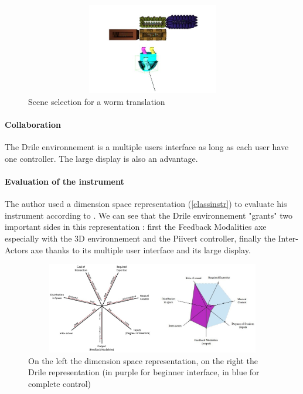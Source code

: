 \begin{figure}[h!]
\centering\includegraphics[width=14cm,height=4cm]{image/scenes.JPG}
\caption{Scene selection for a worm translation}
\label{fig:scene}
\end{figure} 

\paragraph{Collaboration}

The Drile environnement is a multiple users interface as long as each user have one controller. The large display is also an advantage.

\paragraph{Evaluation of the instrument}

The author used a dimension space representation (\ref{classinstr}) to evaluate his instrument according to \cite{birnbaum2005towards}. We can see that the Drile environnement "grants" two important sides in this representation : first the Feedback Modalities axe especially with the 3D environnement and the Piivert controller, finally the Inter-Actors axe thanks to its multiple user interface and its large display.

\begin{figure}[h!]
\centering\includegraphics[width=14cm,height=4cm]{image/classification_new_instr.jpg}
\caption{On the left the dimension space representation,
on the right the Drile representation (in purple for beginner interface, in blue for complete control)}
\label{fig:classinstr}
\end{figure} 


